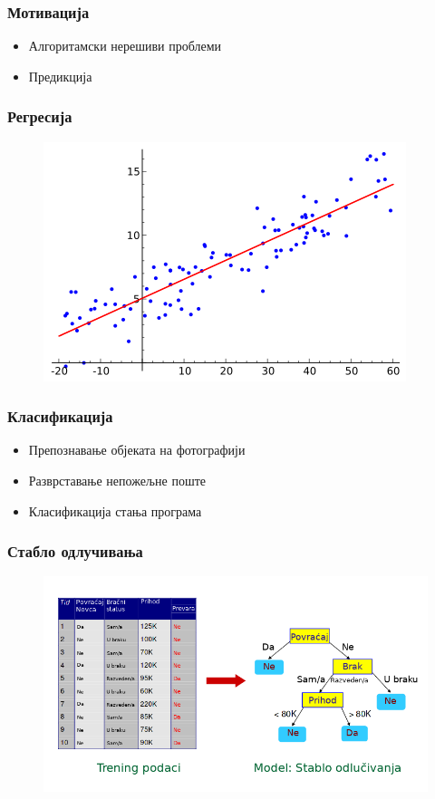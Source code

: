 \documentclass{beamer}
\begin{document}
\begin{frame}
\frametitle{Мотивација}
\begin{itemize}
 	\item Алгоритамски нерешиви проблеми
	\item Предикција
\end{itemize}
\end{frame}
\begin{frame}
\frametitle{Регресија}
\begin{figure}
\centering
\includegraphics[scale=0.4]{slike/linearna_regresija.png}
\end{figure}
\end{frame}
\begin{frame}
\frametitle{Класификација}
\begin{itemize}
 	\item Препознавање објеката на фотографији
 	\item Разврставање непожељне поште
 	\item Класификација стања програма
\end{itemize}
\end{frame}
\begin{frame}
\frametitle{Стабло одлучивања}
\begin{figure}
\centering
\includegraphics[scale=0.4]{slike/decision_tree.png}
\end{figure}
\end{frame}
\end{document}
